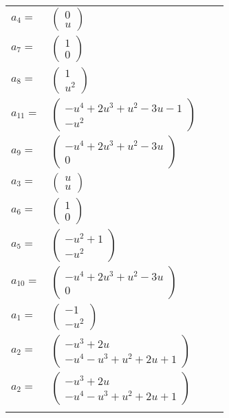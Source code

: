 \documentclass[1p]{elsarticle_modified}
\theoremstyle{definition}
\begin{document}
\begin{tabular}{m{7pt} m{180pt} m{7pt} m{180pt} }
\flushright $a_{4}=$&$\begin{pmatrix}0\\u\end{pmatrix}$ \\
\flushright $a_{7}=$&$\begin{pmatrix}1\\0\end{pmatrix}$ \\
\flushright $a_{8}=$&$\begin{pmatrix}1\\u^2\end{pmatrix}$ \\
\flushright $a_{11}=$&$\begin{pmatrix}- u^4+2 u^3+u^2-3 u-1\\- u^2\end{pmatrix}$ \\
\flushright $a_{9}=$&$\begin{pmatrix}- u^4+2 u^3+u^2-3 u\\0\end{pmatrix}$ \\
\flushright $a_{3}=$&$\begin{pmatrix}u\\u\end{pmatrix}$ \\
\flushright $a_{6}=$&$\begin{pmatrix}1\\0\end{pmatrix}$ \\
\flushright $a_{5}=$&$\begin{pmatrix}- u^2+1\\- u^2\end{pmatrix}$ \\
\flushright $a_{10}=$&$\begin{pmatrix}- u^4+2 u^3+u^2-3 u\\0\end{pmatrix}$ \\
\flushright $a_{1}=$&$\begin{pmatrix}-1\\- u^2\end{pmatrix}$ \\
\flushright $a_{2}=$&$\begin{pmatrix}- u^3+2 u\\- u^4- u^3+u^2+2 u+1\end{pmatrix}$\\ \flushright $a_{2}=$&$\begin{pmatrix}- u^3+2 u\\- u^4- u^3+u^2+2 u+1\end{pmatrix}$\\&\end{tabular}
\end{document}
